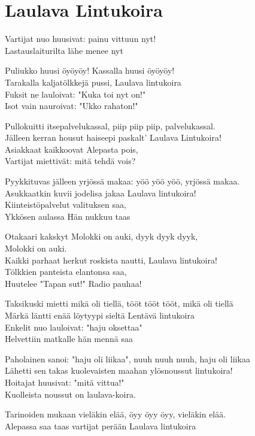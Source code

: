\section{Laulava Lintukoira}
Vartijat nuo huusivat: painu vittuun nyt!\\
Lastauslaiturilta lähe menee nyt

Puliukko huusi öyöyöy! Kassalla huusi öyöyöy!\\
Tarakalla kaljatölkkejä pussi, Laulava lintukoira\\
Fuksit ne lauloivat: "Kuka toi nyt on!"\\
Isot vain nauroivat: "Ukko rahaton!"

Pullokuitti itsepalvelukassal, piip piip piip, palvelukassal.\\
Jälleen kerran housut haiseepi paskalt' Laulava Lintukoira!\\
Asiakkaat kaikkoovat Alepasta pois,\\
Vartijat miettivät: mitä tehdä vois?

Pyykkituvas jälleen yrjössä makaa: yöö yöö yöö, yrjössä makaa.\\
Asukkaatkin kuvii jodelisa jakaa Laulava lintukoira!\\
Kiinteistöpalvelut valituksen saa,\\
Ykkösen aulassa Hän nukkuu taas

Otakaari kakskyt Molokki on auki, dyyk dyyk dyyk,\\
Molokki on auki.\\
Kaikki parhaat herkut roskista nautti, Laulava lintukoira!\\
Tölkkien panteista elantonsa saa,\\
Huutelee "Tapan sut!" Radio pauhaa!

Taksikuski mietti mikä oli tiellä, tööt tööt tööt, mikä oli tiellä\\
Märkä läntti enää löytyypi sieltä Lentävä lintukoira\\
Enkelit nuo lauloivat: "haju oksettaa"\\
Helvettiin matkalle hän mennä saa

Paholainen sanoi: "haju oli liikaa", nuuh nuuh nuuh, haju oli liikaa\\
Lähetti sen takas kuolevaisten maahan ylösnoussut lintukoira!\\
Hoitajat huusivat: "mitä vittua!"\\
Kuolleista noussut on laulava-koira.

Tarinoiden mukaan vieläkin elää, öyy öyy öyy, vieläkin elää.\\
Alepassa saa taas vartijat perään Laulava lintukoira